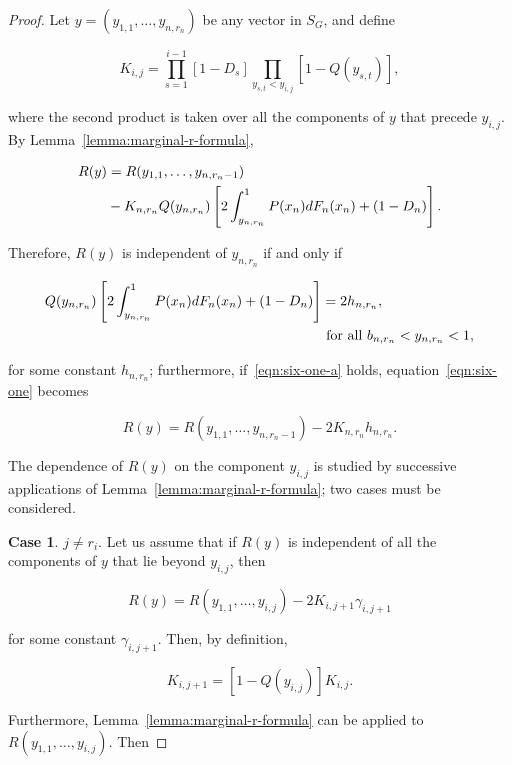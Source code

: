 \documentclass{article}
\theoremstyle{remark}
\begin{document}
\begin{proof}

Let $y = (y_{1, 1}, \dots, y_{n, r_n})$ be any vector in $S_G$, and define

\[
K_{i,j} = \prod_{s=1}^{i-1} [1 - D_s]
          \prod_{y_{s, t} < y_{i, j}} [1 - Q(y_{s, t})],
\]

where the second product is taken over all the components of $y$ that precede
$y_{i, j}$. By Lemma~\ref{lemma:marginal-r-formula},

\begin{align}
R(y) &= R(y_{1, 1}, \dots, y_{n, r_n - 1}) \label{eqn:six-one} \\
 &- K_{n, r_n} Q(y_{n, r_n})
\left [ 2 \int_{y_{n, r_n}}^1 P(x_n) dF_n(x_n) + (1 - D_n) \right ]. \notag
\end{align}

Therefore, $R(y)$ is independent of $y_{n, r_n}$ if and only if

\begin{align}
Q(y_{n, r_n})
\left [ 2 \int_{y_{n, r_n}}^1 P(x_n) dF_n(x_n) + (1 - D_n) \right ] &= 2h_{n,
r_n}, \label{eqn:six-one-a} \\
& \textup{ for all } b_{n, r_n} < y_{n, r_n} < 1, \notag
\end{align}

for some constant $h_{n, r_n}$; furthermore, if~\eqref{eqn:six-one-a} holds,
equation~\eqref{eqn:six-one} becomes

\begin{equation} \label{eqn:six-one-b}
R(y) = R(y_{1, 1}, \dots, y_{n, r_n-1}) - 2K_{n, r_n} h_{n, r_n}.
\end{equation}

The dependence of $R(y)$ on the component $y_{i,j}$ is studied by successive
applications of Lemma~\ref{lemma:marginal-r-formula}; two cases must be
considered.

\textbf{Case 1}. $j \neq r_i$. Let us assume that if $R(y)$ is independent of
all the components of $y$ that lie beyond $y_{i, j}$, then

\begin{equation} \label{eqn:six-second-b}
R(y) = R(y_{1, 1}, \dots, y_{i, j}) - 2K_{i, j+1} \gamma_{i, j+1}
\end{equation}

for some constant $\gamma_{i, j+1}$. Then, by definition,

\[
K_{i, j+1} = [1 - Q(y_{i,j})] K_{i,j}.
\]

Furthermore, Lemma~\ref{lemma:marginal-r-formula} can be applied to $R(y_{1,
1}, \dots, y_{i, j})$. Then


\end{proof}
\end{document}
